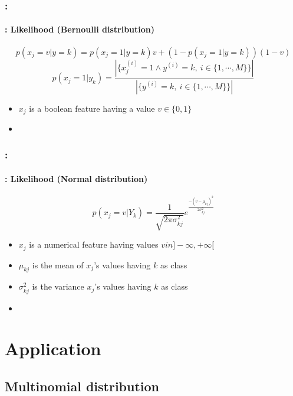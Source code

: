 \documentclass[xcolor=table]{beamer}
\begin{document}
\begin{frame}
	\frametitle{\insertshortsubtitle: \insertsection}
	\framesubtitle{\insertsubsection: Likelihood (Bernoulli distribution)}
	
	\[p(x_j=v|y=k) = p(x_j=1|y=k) v + (1-p(x_j=1|y=k)) (1-v)\]
	\[p(x_j=1|y_k) = \frac{|\{x_j^{(i)} = 1 \wedge y^{(i)} = k,\ i \in \{1, \cdots, M\}\}|}{|\{y^{(i)} = k,\ i \in \{1, \cdots, M\}\}|}\]
	
	\begin{itemize}
		\item $x_j$ is a boolean feature having a value $v \in \{0, 1\}$
		\item {}
	\end{itemize}
	
	
\end{frame}

\begin{frame}
	\frametitle{\insertshortsubtitle: \insertsection}
	\framesubtitle{\insertsubsection: Likelihood (Normal distribution)}
	
	\[p(x_j = v|Y_k) = \frac{1}{\sqrt{2\pi \sigma_{kj}^2}} e^\frac{-(v-\mu_{kj})^2}{2 \sigma_{kj}^2}\]
	
	\begin{itemize}
		\item $x_j$ is a numerical feature having values $ v in ]-\infty, +\infty[ $
		\item $\mu_{kj}$ is the mean of $x_j$'s values having $k$ as class
		\item $\sigma_{kj}^2$ is the variance $x_j$'s values having $k$ as class
		\item {}
	\end{itemize}
	
	
\end{frame}

\section{Application}

\begin{frame}
	\frametitle{\insertshortsubtitle}
	\framesubtitle{\insertsection}
	
	
\end{frame}

\subsection{Multinomial distribution}
\end{document}
